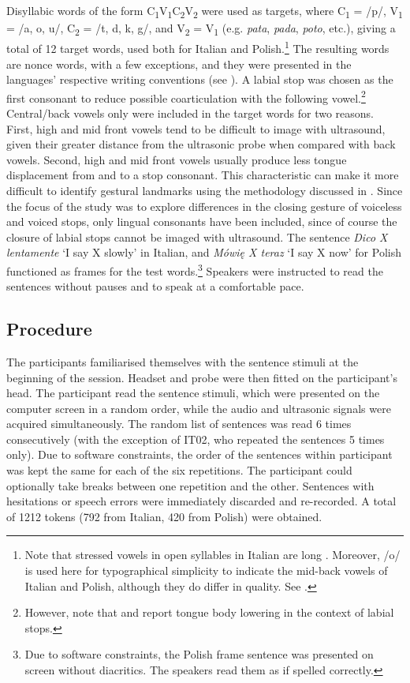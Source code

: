 \documentclass[12pt,]{article}
\let\rmarkdownfootnote\footnote%
\def\footnote{\protect\rmarkdownfootnote}
\begin{document}
Disyllabic words of the form
C\textsubscript{1}V\textsubscript{1}C\textsubscript{2}V\textsubscript{2}
were used as targets, where C\textsubscript{1} = /p/, V\textsubscript{1}
= /a, o, u/, C\textsubscript{2} = /t, d, k, g/, and V\textsubscript{2} =
V\textsubscript{1} (e.g. \emph{pata}, \emph{pada}, \emph{poto}, etc.),
giving a total of 12 target words, used both for Italian and
Polish.\footnote{Note that stressed vowels in open syllables in Italian are long \citep{renwick2016}. Moreover, /o/ is used here for typographical simplicity to indicate the mid-back vowels of Italian and Polish, although they do differ in quality. See \citet{kramer2009, renwick2016, gussmann2007}.}
The resulting words are nonce words, with a few exceptions, and they
were presented in the languages' respective writing conventions (see
). A labial stop was chosen as the first consonant to
reduce possible coarticulation with the following
vowel.\footnote{However, note that \citet{westbury1983} and \citet{vazquez-alvarez2007} report tongue body lowering in the context of labial stops.}
Central/back vowels only were included in the target words for two
reasons. First, high and mid front vowels tend to be difficult to image
with ultrasound, given their greater distance from the ultrasonic probe
when compared with back vowels. Second, high and mid front vowels
usually produce less tongue displacement from and to a stop consonant.
This characteristic can make it more difficult to identify gestural
landmarks using the methodology discussed in . Since the
focus of the study was to explore differences in the closing gesture of
voiceless and voiced stops, only lingual consonants have been included,
since of course the closure of labial stops cannot be imaged with
ultrasound. The sentence \emph{Dico X lentamente} `I say X slowly' in
Italian, and \emph{Mówię X teraz} `I say X now' for Polish functioned as
frames for the test
words.\footnote{Due to software constraints, the Polish frame sentence was presented on screen without diacritics. The speakers read them as if spelled correctly.}
Speakers were instructed to read the sentences without pauses and to
speak at a comfortable pace.

\subsection{Procedure}\label{procedure}

The participants familiarised themselves with the sentence stimuli at
the beginning of the session. Headset and probe were then fitted on the
participant's head. The participant read the sentence stimuli, which
were presented on the computer screen in a random order, while the audio
and ultrasonic signals were acquired simultaneously. The random list of
sentences was read 6 times consecutively (with the exception of IT02,
who repeated the sentences 5 times only). Due to software constraints,
the order of the sentences within participant was kept the same for each
of the six repetitions. The participant could optionally take breaks
between one repetition and the other. Sentences with hesitations or
speech errors were immediately discarded and re-recorded. A total of
1212 tokens (792 from Italian, 420 from Polish) were obtained.
\end{document}
